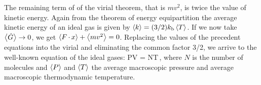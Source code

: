 The remaining term of of the virial theorem, that is $mv^2$, is twice the value of kinetic energy. Again from the theorem of energy equipartition the average kinetic energy of an ideal gas is given by $\left\langle{k}\right\rangle = (3/2)k_\text{b}\left\langle{T}\right\rangle$. If we now take $\left\langle{\dot{G}}\right\rangle\to 0$, we get $\left\langle{F\operatorname{\cdot}x}\right\rangle + \left\langle{mv^2}\right\rangle = 0$. Replacing the values of the precedent equations into the virial and eliminating the common factor 3/2, we arrive to the well-known equation of the ideal gases:
\beq
\avg PV = N\boltz\avg T\,,
\eeq
where $N$ is the number of molecules and $\left\langle{P}\right\rangle$ and $\left\langle{T}\right\rangle$ the average macroscopic pressure and average macroscopic thermodynamic temperature.





